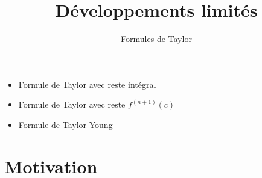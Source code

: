 







\title{{\bf Développements limités}}
\subtitle{Formules de Taylor}

\begin{frame}
  
  \debutmontitre

  \pause

{\footnotesize
\hfill
{}
\begin{minipage}{0.6\textwidth}
  \begin{itemize}
    \item<3-> Formule de Taylor avec reste intégral
    \item<4-> Formule de Taylor avec reste $f^{(n+1)}(c)$
    \item<5-> Formule de Taylor-Young
  \end{itemize}
\end{minipage}
}

\end{frame}

\setcounter{framenumber}{0}




\section*{Motivation}


